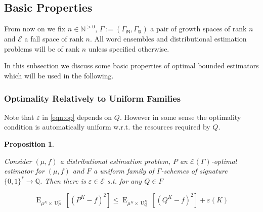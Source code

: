\documentclass{article}
\numberwithin{equation}{section}
\theoremstyle{definition}
\theoremstyle{plain}
\newtheorem{proposition}{Proposition}[section]
\newcommand{\Bool}{\{0,1\}}
\newcommand{\Words}{{\Bool^*}}
\DeclareMathOperator{\E}{E}
\DeclareMathOperator{\Un}{U}
\newcommand{\Nats}{\mathbb{N}}
\newcommand{\Rats}{\mathbb{Q}}
\newcommand{\GrowR}{\Gamma_{\mathfrak{R}}}
\newcommand{\GrowA}{\Gamma_{\mathfrak{A}}}
\newcommand{\Grow}{\Gamma:=(\GrowR,\GrowA)}
\newcommand{\Fall}{\mathcal{E}}
\newcommand{\EG}{\Fall(\Gamma)}
\begin{document}
\subsection{Basic Properties}

From now on we fix $n \in \Nats^{>0}$, $\Grow$ a pair of growth spaces of rank $n$ and $\Fall$ a fall space of rank $n$. All word ensembles and distributional estimation problems will be of rank ${n}$ unless specified otherwise.

In this subsection we discuss some basic properties of optimal bounded estimators which will be used in the following.

\subsubsection{Optimality Relatively to Uniform Families}

Note that $\varepsilon$ in \ref{eqn:op} depends on $Q$. However in some sense the optimality condition is automatically uniform w.r.t. the resources required by $Q$.

\begin{proposition}
\label{prp:unif}

Consider $(\mu,f)$ a distributional estimation problem, $P$ an $\EG$-optimal estimator for $(\mu,f)$ and $F$ a uniform family of $\Gamma$-schemes of signature $\Words \rightarrow \Rats$. Then there is $\varepsilon \in \Fall$ s.t. for any $Q \in F$

\begin{equation}
\E_{\mu^{K} \times \Un_P^{K}}[(P^{K} - f)^2] \leq \E_{\mu^{K} \times \Un_Q^{K}}[(Q^{K} - f)^2] + \varepsilon(K)
\end{equation}

\end{proposition}
\end{document}
